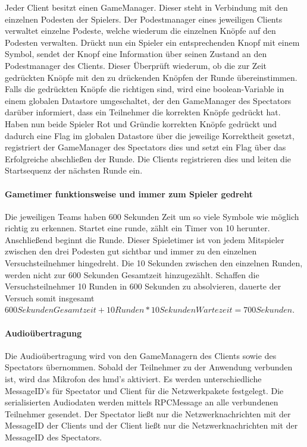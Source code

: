 \documentclass[a4paper,11pt]{article}%
\renewcommand{\\}{\vspace*{0.5\baselineskip} \newline}
\begin{document}
Jeder Client besitzt einen GameManager. Dieser steht in Verbindung mit den einzelnen Podesten der Spielers. Der Podestmanager eines jeweiligen Clients verwaltet einzelne Podeste, welche wiederum die einzelnen Knöpfe auf den Podesten verwalten. 
Drückt nun ein Spieler ein entsprechenden Knopf mit einem Symbol, sendet der Knopf eine Information über seinen Zustand an den Podestmanager des Clients. Dieser Überprüft wiederum, ob die zur Zeit gedrückten Knöpfe mit den zu drückenden Knöpfen der Runde übereinstimmen. Falls die gedrückten Knöpfe die richtigen sind, wird eine boolean-Variable in einem globalen Datastore umgeschaltet, der den GameManager des Spectators darüber informiert, dass ein Teilnehmer die korrekten Knöpfe gedrückt hat. Haben nun beide Spieler \flqq Rot und Grün\frqq die korrekten Knöpfe gedrückt und dadurch eine Flag im globalen Datastore über die jeweilige Korrektheit gesetzt, registriert der GameManager des Spectators dies und setzt ein Flag über das Erfolgreiche abschließen der Runde. Die Clients registrieren dies und leiten die Startsequenz der nächsten Runde ein. 

\paragraph{Gametimer funktionsweise und immer zum Spieler gedreht}
Die jeweiligen Teams haben 600 Sekunden Zeit um so viele Symbole wie möglich richtig zu erkennen. Startet eine runde, zählt ein Timer von 10 herunter. Anschließend beginnt die Runde. Dieser Spieletimer ist von jedem Mitspieler zwischen den drei Podesten gut sichtbar und immer zu den einzelnen Versuchsteilnehmer hingedreht. Die 10 Sekunden zwischen den einzelnen Runden, werden nicht zur 600 Sekunden Gesamtzeit hinzugezählt. Schaffen die Versuchsteilnehmer 10 Runden in 600 Sekunden zu absolvieren, dauerte der Versuch somit insgesamt \\
$600 Sekunden Gesamtzeit + 10 Runden * 10 Sekunden Wartezeit = 700 Sekunden$.

\paragraph{Audioübertragung}
Die Audioübertragung wird von den GameManagern des Clients sowie des Spectators übernommen. Sobald der Teilnehmer zu der Anwendung verbunden ist, wird das Mikrofon des \ac{hmd}'s aktiviert. Es werden unterschiedliche MessageID's für Spectator und Client für die Netzwerkpakete festgelegt. Die serialisierten Audiodaten werden mittels RPCMessage an alle verbundenen Teilnehmer gesendet. Der Spectator ließt nur die Netzwerknachrichten mit der MessageID der Clients und der Client ließt nur die Netzwerknachrichten mit der MessageID des Spectators.
\end{document}
